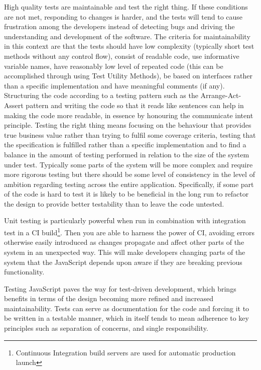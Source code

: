 \documentclass[11pt]{article}
\begin{document}
High quality tests are maintainable and test the right thing. If these conditions are not met, responding to changes is harder, and the tests will tend to cause frustration among the developers instead of detecting bugs and driving the understanding and development of the software\cite{Clean}. The criteria for maintainability in this context are that the tests should have low complexity (typically short test methods without any control flow), consist of readable code, use informative variable names, have reasonably low level of repeated code (this can be accomplished through using Test Utility Methods\cite[599]{TestPatterns}), be based on interfaces rather than a specific implementation and have meaningful comments (if any). Structuring the code according to a testing pattern such as the Arrange-Act-Assert\cite{C2} pattern and writing the code so that it reads like sentences can help in making the code more readable, in essence by honouring the communicate intent principle\cite[p.~41]{TestPatterns}. Testing the right thing means focusing on the behaviour that provides true business value rather than trying to fulfil some coverage criteria, testing that the specification is fulfilled rather than a specific implementation and to find a balance in the amount of testing performed in relation to the size of the system under test. Typically some parts of the system will be more complex and require more rigorous testing but there should be some level of consistency in the level of ambition regarding testing across the entire application. Specifically, if some part of the code is hard to test it is likely to be beneficial in the long run to refactor the design to provide better testability than to leave the code untested.

Unit testing is particularly powerful when run in combination with integration test in a CI build\footnote{Continuous Integration build servers are used for automatic production launch}. Then you are able to harness the power of CI, avoiding errors otherwise easily introduced as changes propagate and affect other parts of the system in an unexpected way. This will make developers changing parts of the system that the JavaScript depends upon aware if they are breaking previous functionality.

Testing JavaScript paves the way for test-driven development, which brings benefits in terms of the design becoming more refined and increased maintainability. Tests can serve as documentation for the code and forcing it to be written in a testable manner, which in itself tends to mean adherence to key principles such as separation of concerns, and single responsibility.
\end{document}
